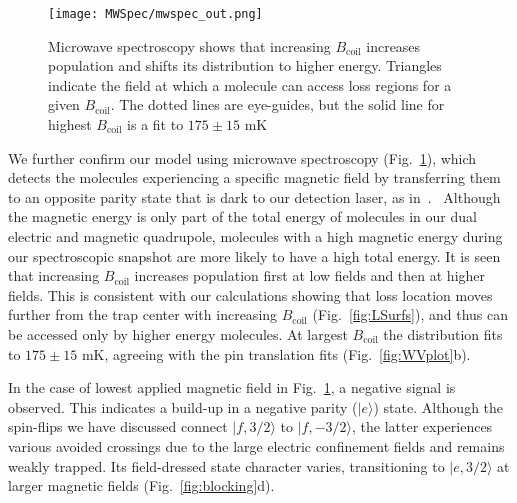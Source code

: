 \documentclass[%
 reprint,
 amsmath,amssymb,
 aps,
prl,
]{revtex4-1}
\newcommand{\bcl}{{$B_\text{coil}$}}
\newcommand{\cmnt}[1]{\ignorespaces}
\begin{document}
\begin{figure}[tb]
\texttt{[image: MWSpec/mwspec\_out.png]}%
\caption{
Microwave spectroscopy shows that increasing \bcl{} increases population and shifts its distribution to higher energy. Triangles indicate the field at which a molecule can access loss regions for a given \bcl. The dotted lines are eye-guides, but the solid line for highest \bcl{} is a fit to $175\pm15\text{ mK}$
\label{fig:spec}}
\end{figure}

We further confirm our model using microwave spectroscopy (Fig.~\ref{fig:spec}), which detects the molecules experiencing a specific magnetic field by transferring them to an opposite parity state that is dark to our detection laser, as in~\cite{Stuhl2012evap}.\cmnt{, except here we turn off the electric trapping field just before the spectroscopy, which happens before any significant molecular motion. \cmnt{but with a microwave probe directly exciting free space modes of our vacuum chamber\cmnt{instead of a bias tee}.}}  ~Although the magnetic energy is only part of the total energy of molecules in our dual electric and magnetic quadrupole, molecules with a high magnetic energy during our spectroscopic snapshot are more likely to have a high total energy. It is seen that increasing \bcl{} increases population first at low fields and then at higher fields. This is consistent with our calculations showing that loss location moves further from the trap center with increasing \bcl{} (Fig.~\ref{fig:LSurfs}), and thus can be accessed only by higher energy molecules. At largest \bcl{} the distribution fits to $175\pm15\text{ mK}$, agreeing with the pin translation fits (Fig.~\ref{fig:WVplot}b).%


In the case of lowest applied magnetic field in Fig.~\ref{fig:spec}, a negative signal is observed. This indicates a build-up in a negative parity ($|e\rangle$) state. Although the spin-flips we have discussed connect $|f,3/2\rangle$ to $|f,-3/2\rangle$, the latter experiences various avoided crossings due to the large electric confinement fields and remains weakly trapped.  Its field-dressed state character varies, transitioning to $|e,3/2\rangle$ at larger magnetic fields (Fig.~\ref{fig:blocking}d). %
\end{document}
